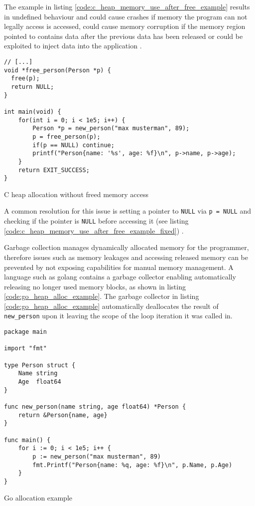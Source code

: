 The example in listing \autoref{code:c_heap_memory_use_after_free_example}
results in undefined behaviour
\cite[Description]{owasp-use-after-free_unkown_unknown} and could cause
crashes if memory the program can not legally access is accessed, could cause
memory corruption if the memory region pointed to contains data after the
previous data has been released or could be exploited to inject data into the
application \cite[Consequences]{owasp-use-after-free_unkown_unknown}.

\begin{listing}[H] 
    \begin{verbatim} 
// [...]
void *free_person(Person *p) {
  free(p);
  return NULL;
}

int main(void) {
    for(int i = 0; i < 1e5; i++) {
        Person *p = new_person("max musterman", 89);
        p = free_person(p);
        if(p == NULL) continue;
        printf("Person{name: '%s', age: %f}\n", p->name, p->age);
    }
    return EXIT_SUCCESS;
}
    \end{verbatim}
    \caption{C heap allocation without freed memory access}
    \label{code:c_heap_memory_use_after_free_example_fixed}
\end{listing}

A common resolution for this issue is setting a pointer to \texttt{NULL} via
\texttt{p = NULL} and checking if the pointer is \texttt{NULL} before
accessing it (see listing
\autoref{code:c_heap_memory_use_after_free_example_fixed}) \cite[Related
Controls]{owasp-use-after-free_unkown_unknown}. 

Garbage collection manages dynamically allocated memory for the programmer,
therefore issues such as memory leakages and accessing released memory can be
prevented by not exposing capabilities for manual memory management. A
language such as golang contains a garbage collector
\cite[Introduction]{go_spec_2023} enabling automatically releasing no longer
used memory blocks, as shown in listing \autoref{code:go_heap_alloc_example}.
The garbage collector in listing \autoref{code:go_heap_alloc_example}
automatically deallocates the result of \texttt{new\_person} upon it leaving
the scope of the loop iteration it was called in.

\begin{listing}[H] 
    \begin{verbatim} 
package main

import "fmt"

type Person struct {
    Name string
    Age  float64
}

func new_person(name string, age float64) *Person {
    return &Person{name, age}
}

func main() {
    for i := 0; i < 1e5; i++ {
        p := new_person("max musterman", 89)
        fmt.Printf("Person{name: %q, age: %f}\n", p.Name, p.Age)
    }
}
    \end{verbatim}
    \caption{Go allocation example}
    \label{code:go_heap_alloc_example}
\end{listing}
